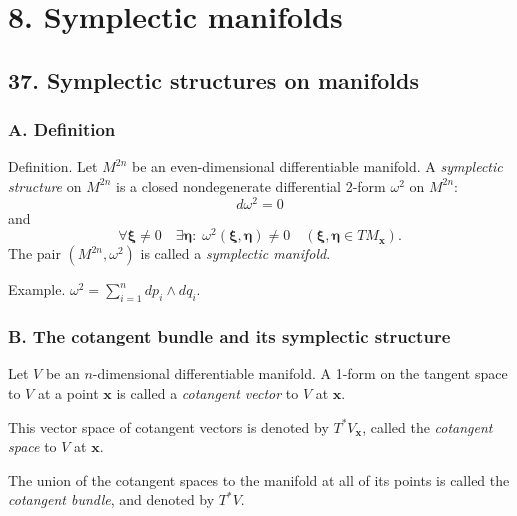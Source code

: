 \documentclass{book}
\begin{document}
\newcommand{\repl}[2]{{\color{gray} [#1] }{\color{blue} #2}}
\newcommand{\add}[1]{{\color{blue} #1}}
\newcommand{\del}[1]{{\color{gray} [#1]}}
\newcommand{\note}[1]{{\color{OliveGreen}\small [\textbf{Comment.} #1]}}

\newcommand{\hl}[1]{{\color{red} #1}}

\tableofcontents




\chapter{8. Symplectic manifolds}



\section{37. Symplectic structures on manifolds}



\subsection{A. Definition}



Definition.  Let $M^{2n}$ be an even-dimensional differentiable manifold.
A \emph{symplectic structure} on $M^{2n}$ is a closed nondegenerate differential 2-form
$\omega^2$ on $M^{2n}$:
$$
d\omega^2 = 0
$$
and
$$
\forall \pmb \xi \ne 0
\quad
\exists \pmb \eta:
\;
\omega^2(\pmb \xi, \pmb \eta) \ne 0
\quad
(\pmb \xi, \pmb \eta \in TM_{\pmb x}).
$$
The pair $(M^{2n}, \omega^2)$ is called
a \emph{symplectic manifold}.


Example.
$\omega^2 = \sum_{i = 1}^n dp_i \wedge dq_i$.



\subsection{B. The cotangent bundle and its symplectic structure}



Let $V$ be an $n$-dimensional differentiable manifold.
%
A 1-form on the tangent space to $V$ at a point $\mathbf x$ is called
a \emph{cotangent vector} to $V$ at $\mathbf x$.

This vector space of cotangent vectors is denoted by $T^*V_{\mathbf x}$,
called the \emph{cotangent space} to $V$ at $\mathbf x$.

The union of the cotangent spaces to the manifold at all of its points
is called the \emph{cotangent bundle}, and denoted by $T^*V$.
\end{document}
